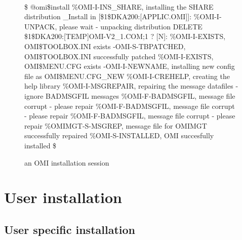 \documentclass[a4paper]{book}
\begin{document}
\begin{figure}[ht]
\begin{minipage}[t]{\textwidth}
\hrulefill \\
\begin{ttfamily}\begin{small}
{\$} @omi{\$}install  \newline
{\%}OMI-I-INS{\_}SHARE, installing the SHARE distribution \newline
{\_}Install in [{\$}1{\$}DKA200:[APPLIC.OMI]]: \newline
{\%}OMI-I-UNPACK, please wait - unpacking distribution \newline
DELETE {\$}1{\$}DKA200:[TEMP]OMI-V2{\_}1.COM;1 ? [N]: \newline
{\%}OMI-I-EXISTS, OMI{\$}TOOLBOX.INI exists \newline
-OMI-S-TBPATCHED, OMI{\$}TOOLBOX.INI successfully patched \newline
{\%}OMI-I-EXISTS, OMI{\$}MENU.CFG exists \newline
-OMI-I-NEWNAME, installing new config file as OMI{\$}MENU.CFG{\_}NEW \newline
{\%}OMI-I-CREHELP, creating the help library \newline
{\%}OMI-I-MSGREPAIR, repairing the message datafiles - ignore BADMSGFIL messages \newline
{\%}OMI-F-BADMSGFIL, message file corrupt - please repair \newline
{\%}OMI-F-BADMSGFIL, message file corrupt - please repair \newline
{\%}OMI-F-BADMSGFIL, message file corrupt - please repair \newline
{\%}OMIMGT-S-MSGREP, message file for OMIMGT successfully repaired \newline
{\%}OMI-S-INSTALLED, OMI succesfully installed \newline
{\$}
\end{small}\end{ttfamily}
\caption{an OMI installation session}\label{fig:systinst}
\hrulefill
\end{minipage}
\end{figure}


\section{User installation}
\label{subsec:mylabel1}

\subsection{User specific installation}
\label{subsubsec:mylabel1}
\end{document}
